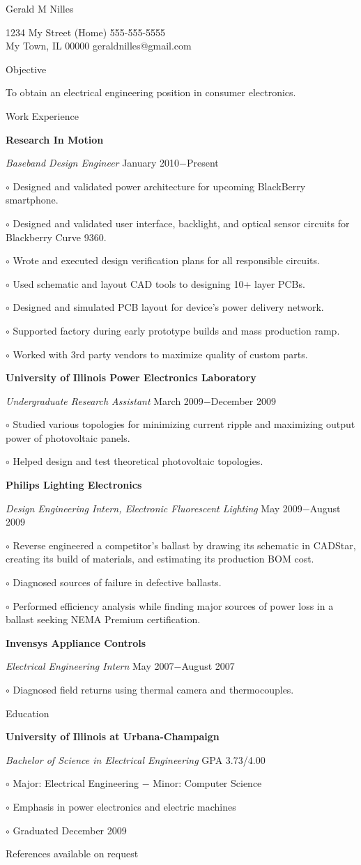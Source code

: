 \documentclass[12pt, letterpaper]{article}
\newcommand{\myname}[1]{{\begin{center} \LARGE #1 \end{center} \par }}
\newcommand{\myhead}[1]{{\vspace{2mm} \Large #1 \par}}
\newcommand{\objective}[1]{{\addtolength{\leftskip}{10mm} #1 \par }}
\newcommand{\company}[1]{{\vspace{1mm} \addtolength{\leftskip}{10mm} \textbf{#1} \par}}
\newcommand{\position}[2]{{\addtolength{\leftskip}{10mm} \emph{#1} \hfill #2 \par \vspace{1mm}}}
\newcommand{\skill}[1]{{  \vspace{0.3mm} \addtolength{\leftskip}{20mm} \setlength\parindent{-4mm} $\circ$ #1 \par}}
\begin{document}
\pagestyle{empty}
\raggedright

\myname{Gerald M Nilles}
1234 My Street  \hfill (Home) 555-555-5555 \\
My Town, IL 00000   \hfill geraldnilles@gmail.com \\
\myhead{Objective}
    \objective{To obtain an electrical engineering position in consumer electronics.}

\myhead{Work Experience}
    \company{Research In Motion}
    \position{Baseband Design Engineer}{January 2010$-$Present}
        \skill{Designed and validated power architecture for upcoming BlackBerry smartphone.}
        \skill{Designed and validated user interface, backlight, and optical sensor circuits for Blackberry Curve 9360.}
        \skill{Wrote and executed design verification plans for all responsible circuits.}
        \skill{Used schematic and layout CAD tools to designing 10+ layer PCBs.}
        \skill{Designed and simulated PCB layout for device's power delivery network.}
        \skill{Supported factory during early prototype builds and mass production ramp.}
        \skill{Worked with 3rd party vendors to maximize quality of custom parts.}

    \company{University of Illinois Power Electronics Laboratory}
    \position{Undergraduate Research Assistant}{March 2009$-$December 2009}
        \skill{Studied various topologies for minimizing current ripple and maximizing output power of photovoltaic panels.}
        \skill{Helped design and test theoretical photovoltaic topologies.}

    \company{Philips Lighting Electronics} 
    \position{Design Engineering Intern, Electronic Fluorescent Lighting}{May 2009$-$August 2009}
        \skill{Reverse engineered a competitor's ballast by drawing its schematic in CADStar, creating its build of materials, and estimating its production BOM cost.}
        \skill{Diagnosed sources of failure in defective ballasts.}
        \skill{Performed efficiency analysis while finding major sources of power loss in a ballast seeking NEMA Premium certification.}

    \company{Invensys Appliance Controls}
    \position{Electrical Engineering Intern}{May 2007$-$August 2007}
        \skill{Diagnosed field returns using thermal camera and thermocouples.}

\myhead{Education}
    \company{University of Illinois at Urbana-Champaign}
    \position{Bachelor of Science in Electrical Engineering}{GPA 3.73/4.00}
        \skill{Major: Electrical Engineering $-$ Minor: Computer Science}
        \skill{Emphasis in power electronics and electric machines}
        \skill{Graduated December 2009}

\begin{center}
\small
References available on request
\end{center}
\end{document}
